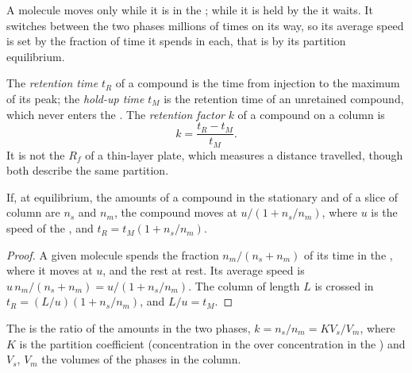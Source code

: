A molecule moves only while it is in the ; while it is held by the  it
waits. It switches between the two phases millions of times on its way, so its average speed is set by
the fraction of time it spends in each, that is by its partition equilibrium.

\begin{definition}[Retention]\label{def:b2:chromatography:retention}
The \emph{retention time} $t_R$ of a compound is the time from injection to the
maximum of its peak; the \emph{hold-up time} $t_M$ is the retention time of an
unretained compound, which never enters the . The \emph{retention factor} $k$ of a compound on a column is
\begin{equation*}
k = \frac{t_R - t_M}{t_M}.
\end{equation*}
It is not the $R_f$ of a thin-layer plate, which measures a distance travelled, though both describe
the same partition.
\end{definition}

\begin{proposition}\label{prop:b2:chromatography:retention-time}
If, at equilibrium, the amounts of a compound in the stationary and  of a slice of column
are $n_s$ and $n_m$, the compound moves at $u/(1 + n_s/n_m)$, where $u$ is the speed of the ,
and $t_R = t_M(1 + n_s/n_m)$.
\end{proposition}

\begin{proof}
A given molecule spends the fraction $n_m/(n_s + n_m)$ of its time in the , where it moves at
$u$, and the rest at rest. Its average speed is $u\,n_m/(n_s + n_m) = u/(1 + n_s/n_m)$. The column of
length $L$ is crossed in $t_R = (L/u)(1 + n_s/n_m)$, and $L/u = t_M$.
\end{proof}

\begin{proposition}\label{prop:b2:chromatography:k-and-K}
The  is the ratio of the amounts in the two phases, $k = n_s/n_m = KV_s/V_m$, where $K$
is the partition coefficient (concentration in the  over concentration in the ) and $V_s$, $V_m$ the volumes of the phases in the column.
\end{proposition}


